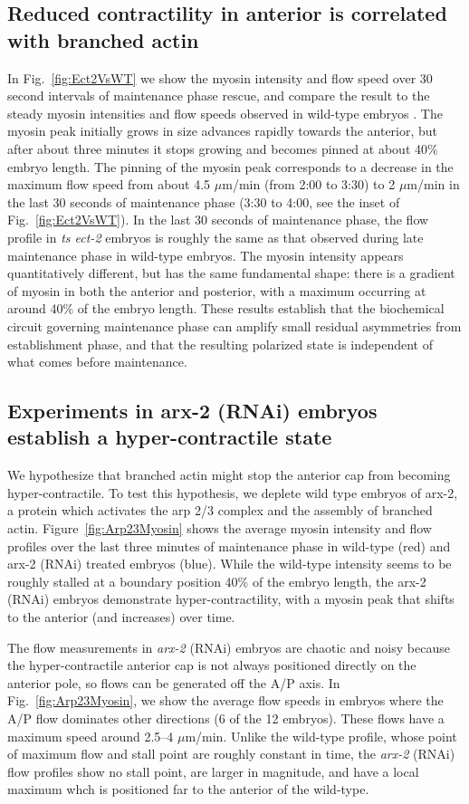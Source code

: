 \documentclass[11pt]{article}
\newcommand{\6}[1]{#1_{\text{6}}}
\newcommand{\3}[1]{#1_{\text{3}}}
\begin{document}
\subsection{Reduced contractility in anterior is correlated with branched actin}
In Fig.\ \ref{fig:Ect2VsWT} we show the myosin intensity and flow speed over 30 second intervals of maintenance phase rescue, and compare the result to the steady myosin intensities and flow speeds observed in wild-type embryos \citep{sailer2015dynamic}. The myosin peak initially grows in size advances rapidly towards the anterior, but after about three minutes it stops growing and becomes pinned at about 40\% embryo length. The pinning of the myosin peak corresponds to a decrease in the maximum flow speed from about 4.5 $\mu$m/min (from 2:00 to 3:30) to 2 $\mu$m/min in the last 30 seconds of maintenance phase (3:30 to 4:00, see the inset of Fig.\ \ref{fig:Ect2VsWT}). In the last 30 seconds of maintenance phase, the flow profile in \emph{ts ect-2} embryos is roughly the same as that observed during late maintenance phase in wild-type embryos. The myosin intensity appears quantitatively different, but has the same fundamental shape: there is a gradient of myosin in both the anterior and posterior, with a maximum occurring at around 40\% of the embryo length. These results establish that the biochemical circuit governing maintenance phase can amplify small residual asymmetries from establishment phase, and that the resulting polarized state is independent of what comes before maintenance. 

\subsection{Experiments in arx-2 (RNAi) embryos establish a hyper-contractile state}

We hypothesize that branched actin might stop the anterior cap from becoming hyper-contractile. To test this hypothesis, we deplete wild type embryos of arx-2, a protein which activates the arp 2/3 complex and the assembly of branched actin. Figure\ \ref{fig:Arp23Myosin} shows the average myosin intensity and flow profiles over the last three minutes of maintenance phase in wild-type (red) and arx-2 (RNAi) treated embryos (blue). While the wild-type intensity seems to be roughly stalled at a boundary position 40\% of the embryo length, the arx-2 (RNAi) embryos demonstrate hyper-contractility, with a myosin peak that shifts to the anterior (and increases) over time.

The flow measurements in \emph{arx-2} (RNAi) embryos are chaotic and noisy because the hyper-contractile anterior cap is not always positioned directly on the anterior pole, so flows can be generated off the A/P axis. In Fig.\ \ref{fig:Arp23Myosin}, we show the average flow speeds in embryos where the A/P flow dominates other directions (6 of the 12 embryos). These flows have a maximum speed around 2.5--4 $\mu$m/min. Unlike the wild-type profile, whose point of maximum flow and stall point are roughly constant in time, the \emph{arx-2} (RNAi) flow profiles show no stall point, are larger in magnitude, and have a local maximum whch is positioned far to the anterior of the wild-type. 
\end{document}
